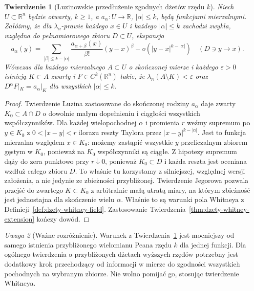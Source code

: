 \documentclass[11pt,a4paper,oneside]{book}
\numberwithin{equation}{chapter}
\theoremstyle{plain}
\newtheorem{twierdzenie}{Twierdzenie}[chapter]
\theoremstyle{definition}
\theoremstyle{remark}
\newtheorem{uwaga}[twierdzenie]{Uwaga}
\begin{document}
\begin{twierdzenie}[Luzinowskie przedłużenie zgodnych dżetów rzędu $k$]
\label{thm:dzety-lusin-higher}
Niech $U\subset\mathbb R^n$ będzie otwarty, $k\ge1$,
a $a_\alpha:U\to\mathbb R$, $|\alpha|\le k$,
będą funkcjami mierzalnymi. Załóżmy, że dla
$\lambda_n$-prawie każdego $x\in U$ i każdego
$|\alpha|\le k$ zachodzi zwykła, względna do
pełnomiarowego zbioru $D\subset U$, ekspansja
\[
 a_\alpha(y)=\sum_{|\beta|\le k-|\alpha|}
 \frac{a_{\alpha+\beta}(x)}{\beta!}(y-x)^\beta
 +o(|y-x|^{k-|\alpha|})\quad(D\ni y\to x).
\]
Wówczas dla każdego mierzalnego $A\subset U$
o skończonej mierze i każdego $\varepsilon>0$
istnieją $K\subset A$ zwarty i
$F\in C^k(\mathbb R^n)$ takie, że
$\lambda_n(A\setminus K)<\varepsilon$ oraz
$D^\alpha F|_K=a_\alpha|_K$ dla wszystkich
$|\alpha|\le k$.
\end{twierdzenie}
\begin{proof}
Twierdzenie Luzina zastosowane do skończonej rodziny
$a_\alpha$ daje zwarty $K_0\subset A\cap D$ o dowolnie
małym dopełnieniu i ciągłości wszystkich współczynników.
Dla każdej wielopochodnej $\alpha$ i promienia $r$
weźmy supremum po $y\in K_0$ z $0<|x-y|<r$
ilorazu reszty Taylora przez $|x-y|^{k-|\alpha|}$.
Jest to funkcja mierzalna względem $x\in K_0$:
możemy zastąpić wszystkie $y$ przeliczalnym zbiorem
gęstym w $K_0$, ponieważ na $K_0$ współczynniki
są ciągłe. Z hipotezy supremum dąży do zera punktowo przy
$r\downarrow0$, ponieważ $K_0\subset D$ i każda
reszta jest oceniana wzdłuż całego zbioru $D$.
To właśnie tu korzystamy z silniejszej, względnej
wersji założenia, a nie jedynie ze zbieżności przybliżonej. Twierdzenie Jegorowa
pozwala przejść do zwartego $K\subset K_0$ z
arbitralnie małą utratą miary, na którym zbieżność
jest jednostajna dla skończenie wielu $\alpha$.
Właśnie to są warunki pola Whitneya z
Definicji~\ref{def:dzety-whitney-field}. Zastosowanie
Twierdzenia~\ref{thm:dzety-whitney-extension}
kończy dowód.
\end{proof}

\begin{uwaga}[Ważne rozróżnienie]
Warunek z Twierdzenia~\ref{thm:dzety-lusin-higher}
jest mocniejszy od samego istnienia przybliżonego
wielomianu Peana rzędu $k$ dla jednej funkcji.
Dla ogólnego twierdzenia o przybliżonych dżetach
wyższych rzędów potrzebny jest dodatkowy krok
przechodzący od informacji w mierze do zgodności
wszystkich pochodnych na wybranym zbiorze.
Nie wolno pomijać go, stosując twierdzenie Whitneya.
\end{uwaga}
\end{document}

